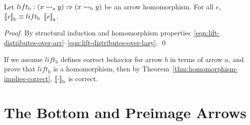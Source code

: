 \documentclass{llncs}
\newcommand{\arrow}{\rightsquigarrow}
\newcommand{\arrowlift}{\ensuremath{lift}}
\newcommand{\gen}{_\mathrm{a}}
\newcommand{\genb}{_\mathrm{b}}
\begin{document}
\begin{theorem}
\label{thm:homomorphism-implies-correct}
Let $\arrowlift\genb : (x \arrow\gen y) \tto (x \arrow\genb y)$ be an arrow homomorphism.
For all $\mathit{e}$, $\meaningof{\mathit{e}}\genb \equiv \arrowlift\genb~\meaningof{\mathit{e}}\gen$.%
\end{theorem}
\begin{proof}
By structural induction and homomorphism properties~\eqref{eqn:lift-distributes-over-arr}--\eqref{eqn:lift-distributes-over-lazy}.
\qed
\end{proof}

If we assume $\arrowlift\genb$ defines correct behavior for arrow $b$ in terms of arrow $a$, and prove that $\arrowlift\genb$ is a homomorphism, then by Theorem~\ref{thm:homomorphism-implies-correct}, $\meaningof{\cdot}\genb$ is correct.


\section{The Bottom and Preimage Arrows}
\end{document}
